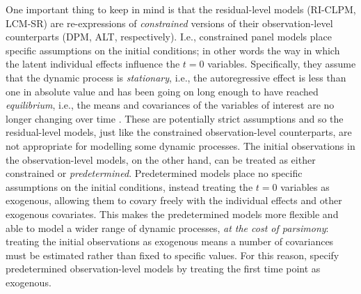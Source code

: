 \documentclass[]{interact}
\theoremstyle{plain}%
\theoremstyle{definition}
\theoremstyle{remark}
\begin{document}
One important thing to keep in mind is that the residual-level models
(RI-CLPM, LCM-SR) are re-expressions of \emph{constrained} versions of
their observation-level counterparts (DPM, ALT, respectively). I.e.,
constrained panel models place specific assumptions on the initial
conditions; in other words the way in which the latent individual
effects influence the \(t = 0\) variables. Specifically, they assume
that the dynamic process is \emph{stationary}, i.e., the autoregressive
effect is less than one in absolute value and has been going on long
enough to have reached \emph{equilibrium}, i.e., the means and
covariances of the variables of interest are no longer changing over
time
\citep{Ou2016, Curran2001, Bollen2004, Jongerling2011, Andersen2021}.
These are potentially strict assumptions and so the residual-level
models, just like the constrained observation-level counterparts, are
not appropriate for modelling some dynamic processes. The initial
observations in the observation-level models, on the other hand, can be
treated as either constrained or \emph{predetermined}. Predetermined
models place no specific assumptions on the initial conditions, instead
treating the \(t = 0\) variables as exogenous, allowing them to covary
freely with the individual effects and other exogenous covariates. This
makes the predetermined models more flexible and able to model a wider
range of dynamic processes, \emph{at the cost of parsimony}: treating
the initial observations as exogenous means a number of covariances must
be estimated rather than fixed to specific values. For this reason,
specify predetermined observation-level models by treating the first
time point as exogenous.
\end{document}
